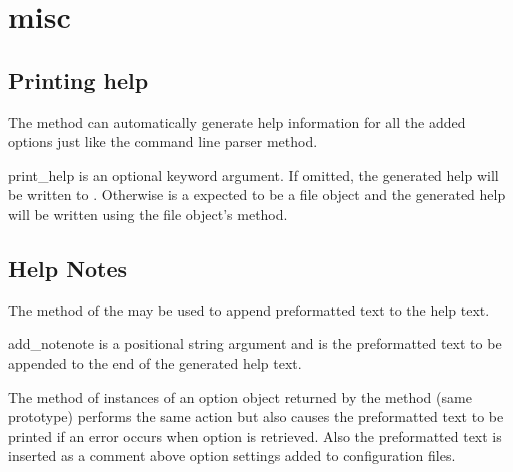 \documentclass{howto}
\begin{document}
\section{misc}

\subsection{Printing help\label{cfgparse-printing-help}}

The  method can automatically generate help information for 
all the added options just like the  command line parser
 method.

  \begin{funcdesc}{print_help}{}
     is an optional keyword argument.  If omitted, the
        generated help will be written to .
        Otherwise  is a expected to be a file object and the 
        generated help will be written using the file object's 
        method.
  \end{funcdesc}

\subsection{Help Notes\label{cfgparse-help-notes}}

The  method of the  may be used to append
preformatted text to the help text.

  \begin{funcdesc}{add_note}{note}
     is a positional string argument and is the preformatted text
        to be appended to the end of the generated help text.
  \end{funcdesc}

The  method of instances of an option object returned by the
 method (same prototype) performs the same action but also
causes the preformatted text to be printed if an error occurs when option is
retrieved.  Also the preformatted text is inserted as a comment above option 
settings added to configuration files.
\end{document}
